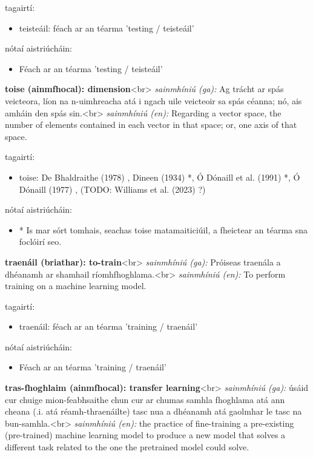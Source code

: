 \documentclass{article}
\begin{document}
tagairtí:
\begin{itemize}
	\item teisteáil: féach ar an téarma 'testing / teisteáil'
\end{itemize}

nótaí aistriúcháin:
\begin{itemize}
	\item Féach ar an téarma 'testing / teisteáil'
\end{itemize}


\textbf{toise (ainmfhocal): dimension}<br>
\textit{sainmhíniú (ga):} Ag trácht ar spás veicteora, líon na n-uimhreacha atá i ngach uile veicteoir sa spás céanna; nó, ais amháin den spás sin.<br>
\textit{sainmhíniú (en):} Regarding a vector space, the number of elements contained in each vector in that space; or, one axis of that space.

tagairtí:
\begin{itemize}
	\item toise: De Bhaldraithe (1978) \cite{de-bhaldraithe}, Dineen (1934) \cite{dineen}*, Ó Dónaill et al. (1991) \cite{focloir-beag}*, Ó Dónaill (1977) \cite{odonaill}, (TODO: Williams et al. (2023) \cite{storchiste}?)
\end{itemize}

nótaí aistriúcháin:
\begin{itemize}
	\item * Is mar sórt tomhais, seachas toise matamaiticiúil, a fheictear an téarma sna foclóirí seo.
\end{itemize}


\textbf{traenáil (briathar): to-train}<br>
\textit{sainmhíniú (ga):} Próiseas traenála a dhéanamh ar shamhail ríomhfhoghlama.<br>
\textit{sainmhíniú (en):} To perform training on a machine learning model.

tagairtí:
\begin{itemize}
	\item traenáil: féach ar an téarma 'training / traenáil'
\end{itemize}

nótaí aistriúcháin:
\begin{itemize}
	\item Féach ar an téarma 'training / traenáil'
\end{itemize}


\textbf{tras-fhoghlaim (ainmfhocal): transfer learning}<br>
\textit{sainmhíniú (ga):} úsáid cur chuige mion-feabhsaithe chun cur ar chumas samhla fhoghlama atá ann cheana (.i. atá réamh-thraenáilte) tasc nua a dhéanamh atá gaolmhar le tasc na bun-samhla.<br>
\textit{sainmhíniú (en):} the practice of fine-training a pre-existing (pre-trained) machine learning model to produce a new model that solves a different task related to the one the pretrained model could solve.
\end{document}
